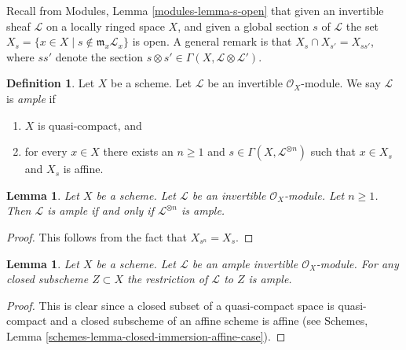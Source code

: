 \documentclass{stacks-project}
\newenvironment{reference}{\comment}{\endcomment}
\theoremstyle{plain}
\newtheorem{lemma}[subsection]{Lemma}
\theoremstyle{definition}
\newtheorem{definition}[subsection]{Definition}
\theoremstyle{remark}
\numberwithin{equation}{subsection}
\begin{document}
\noindent
Recall from Modules, Lemma \ref{modules-lemma-s-open}
that given an invertible sheaf $\mathcal{L}$ on a locally ringed
space $X$, and given a global section $s$ of $\mathcal{L}$
the set $X_s = \{x \in X \mid s \not \in \mathfrak m_x\mathcal{L}_x\}$
is open. A general remark is that
$X_s \cap X_{s'} = X_{ss'}$, where $ss'$ denote
the section $s \otimes s' \in \Gamma(X, \mathcal{L} \otimes \mathcal{L}')$.

\begin{definition}
\label{definition-ample}
\begin{reference}
\cite[II Definition 4.5.3]{EGA}
\end{reference}
Let $X$ be a scheme.
Let $\mathcal{L}$ be an invertible $\mathcal{O}_X$-module.
We say $\mathcal{L}$ is {\it ample} if
\begin{enumerate}
\item $X$ is quasi-compact, and
\item for every $x \in X$ there exists an $n \geq 1$
and $s \in \Gamma(X, \mathcal{L}^{\otimes n})$ such
that $x \in X_s$ and $X_s$ is affine.
\end{enumerate}
\end{definition}

\begin{lemma}
\label{lemma-ample-power-ample}
\begin{reference}
\cite[II Proposition 4.5.6(i)]{EGA}
\end{reference}
Let $X$ be a scheme. Let $\mathcal{L}$ be an invertible $\mathcal{O}_X$-module.
Let $n \geq 1$. Then $\mathcal{L}$ is ample if and only if
$\mathcal{L}^{\otimes n}$ is ample.
\end{lemma}

\begin{proof}
This follows from the fact that $X_{s^n} = X_s$.
\end{proof}

\begin{lemma}
\label{lemma-ample-on-closed}
Let $X$ be a scheme.
Let $\mathcal{L}$ be an ample invertible $\mathcal{O}_X$-module.
For any closed subscheme $Z \subset X$ the restriction of
$\mathcal{L}$ to $Z$ is ample.
\end{lemma}

\begin{proof}
This is clear since a closed subset of a quasi-compact space is quasi-compact
and a closed subscheme of an affine scheme is affine (see
Schemes, Lemma \ref{schemes-lemma-closed-immersion-affine-case}).
\end{proof}
\end{document}
